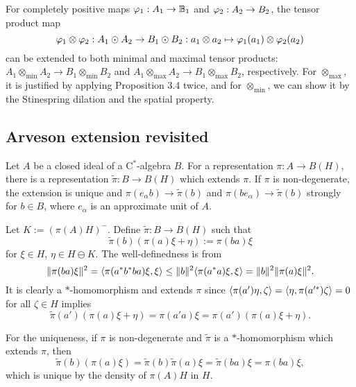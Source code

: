 \documentclass{../../../small}
\begin{document}
\begin{rmk*}
For completely positive maps $\varphi_1:A_1\to\mathbb{B}_1$ and $\varphi_2:A_2\to B_2$, the tensor product map
\[\varphi_1\otimes\varphi_2:A_1\odot A_2\to B_1\odot B_2:a_1\otimes a_2\mapsto\varphi_1(a_1)\otimes\varphi_2(a_2)\]
can be extended to both minimal and maximal tensor products: $A_1\otimes_{\min} A_2\to B_1\otimes_{\min} B_2$ and $A_1\otimes_{\max} A_2\to B_1\otimes_{\max} B_2$, respectively.
For $\otimes_{\max}$, it is justified by applying Proposition 3.4 twice, and for $\otimes_{\min}$, we can show it by the Stinespring dilation and the spatial property.
\end{rmk*}


\subsection{Arveson extension revisited}

\begin{prop}
Let $A$ be a closed ideal of a C$^*$-algebra $B$.
For a representation $\pi:A\to B(H)$, there is a representation $\tilde\pi: B\to B(H)$ which extends $\pi$.
If $\pi$ is non-degenerate, the extension is unique and $\pi(e_\alpha b)\to\tilde\pi(b)$ and $\pi(be_\alpha)\to\tilde\pi(b)$ strongly for $b\in B$, where $e_\alpha$ is an approximate unit of $A$.
\end{prop}
\begin{pf}
Let $K:=(\pi(A)H)^-$.
Define $\tilde\pi: B\to B(H)$ such that
\[\tilde\pi(b)(\pi(a)\xi+\eta):=\pi(ba)\xi\]
for $\xi\in H$, $\eta\in H\ominus K$.
The well-definedness is from
\[\|\pi(ba)\xi\|^2=\langle\pi(a^*b^*ba)\xi,\xi\rangle\le\|b\|^2\langle\pi(a^*a)\xi,\xi\rangle=\|b\|^2\|\pi(a)\xi\|^2.\]
It is clearly a $*$-homomorphism and extends $\pi$ since $\langle\pi(a')\eta,\zeta\rangle=\langle\eta,\pi(a'^*)\zeta\rangle=0$ for all $\zeta\in H$ implies
\[\tilde\pi(a')(\pi(a)\xi+\eta)=\pi(a'a)\xi=\pi(a')(\pi(a)\xi+\eta).\]

For the uniqueness, if $\pi$ is non-degenerate and $\tilde\pi$ is a $*$-homomorphism which extends $\pi$, then
\[\tilde\pi(b)(\pi(a)\xi)=\tilde\pi(b)\tilde\pi(a)\xi=\tilde\pi(ba)\xi=\pi(ba)\xi,\]
which is unique by the density of $\pi(A)H$ in $H$.
\end{pf}
\end{document}
